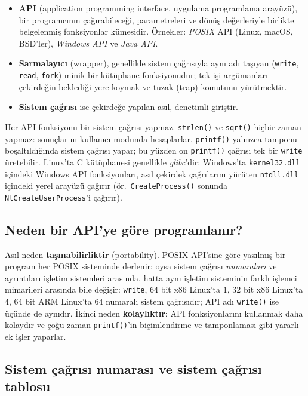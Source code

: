\documentclass[11pt,a4paper]{article}
\newcommand{\term}[1]{\textbf{\color{mintdeep}#1}}
\newcommand{\cmd}[1]{\texttt{#1}}
\begin{document}
\begin{itemize}
  \item \term{API} (application programming interface, uygulama programlama arayüzü), bir programcının çağırabileceği, parametreleri ve dönüş değerleriyle birlikte belgelenmiş fonksiyonlar kümesidir. Örnekler: \emph{POSIX} API (Linux, macOS, BSD'ler), \emph{Windows API} ve \emph{Java API}.
  \item \term{Sarmalayıcı} (wrapper), genellikle sistem çağrısıyla aynı adı taşıyan (\cmd{write}, \cmd{read}, \cmd{fork}) minik bir kütüphane fonksiyonudur; tek işi argümanları çekirdeğin beklediği yere koymak ve tuzak (trap) komutunu yürütmektir.
  \item \term{Sistem çağrısı} ise çekirdeğe yapılan asıl, denetimli giriştir.
\end{itemize}

Her API fonksiyonu bir sistem çağrısı yapmaz. \cmd{strlen()} ve \cmd{sqrt()} hiçbir zaman yapmaz: sonuçlarını kullanıcı modunda hesaplarlar. \cmd{printf()} yalnızca tamponu boşaltıldığında sistem çağrısı yapar; bu yüzden on \cmd{printf()} çağrısı tek bir \cmd{write} üretebilir. Linux'ta C kütüphanesi genellikle \emph{glibc}'dir; Windows'ta \texttt{kernel32.dll} içindeki Windows API fonksiyonları, asıl çekirdek çağrılarını yürüten \texttt{ntdll.dll} içindeki yerel arayüzü çağırır (ör.\ \cmd{CreateProcess()} sonunda \cmd{NtCreateUserProcess}'i çağırır).

\subsection{Neden bir API'ye göre programlanır?}

Asıl neden \textbf{taşınabilirliktir} (portability). POSIX API'sine göre yazılmış bir program her POSIX sisteminde derlenir; oysa sistem çağrısı \emph{numaraları} ve ayrıntıları işletim sistemleri arasında, hatta aynı işletim sisteminin farklı işlemci mimarileri arasında bile değişir: \cmd{write}, 64 bit x86 Linux'ta $1$, 32 bit x86 Linux'ta $4$, 64 bit ARM Linux'ta $64$ numaralı sistem çağrısıdır; API adı \cmd{write()} ise üçünde de aynıdır. İkinci neden \textbf{kolaylıktır}: API fonksiyonlarını kullanmak daha kolaydır ve çoğu zaman \cmd{printf()}'in biçimlendirme ve tamponlaması gibi yararlı ek işler yaparlar.

\subsection{Sistem çağrısı numarası ve sistem çağrısı tablosu}
\end{document}
